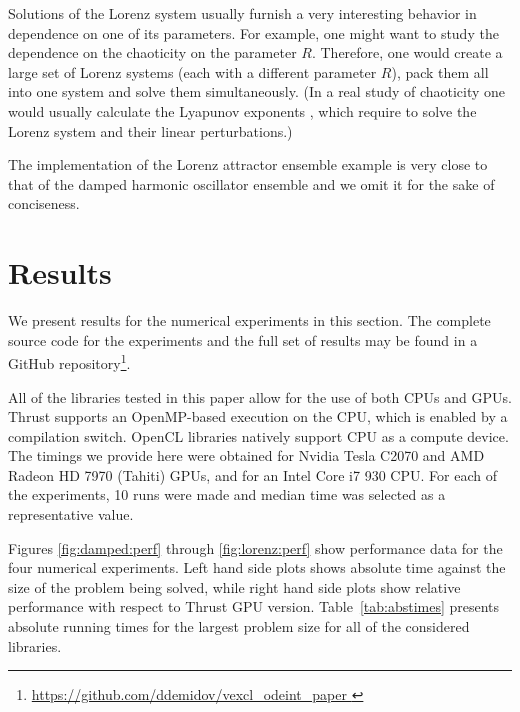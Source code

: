 \documentclass[1p]{elsarticle}
\begin{document}
Solutions of the Lorenz system usually furnish a very interesting
behavior in dependence on one of its parameters.  For example, one
might want to study the dependence on the chaoticity on the parameter
$R$. Therefore, one would create a large set of Lorenz systems (each
with a different parameter $R$), pack them all into one system and
solve them simultaneously. (In a real study of chaoticity one would
usually calculate the Lyapunov exponents \cite{Ott-book-02}, which
require to solve the Lorenz system and their linear perturbations.)


The implementation of the Lorenz attractor ensemble example is very close to
that of the damped harmonic oscillator ensemble and we omit it for the sake of
conciseness.



\section{Results}

We present results for the numerical experiments in this section. The complete
source code for the experiments and the full set of results may be found in a
GitHub repository\footnote{ \href{
https://github.com/ddemidov/vexcl_odeint_paper } {
https://github.com/ddemidov/vexcl\_odeint\_paper } }.


All of the libraries tested in this paper allow for the use of both CPUs and
GPUs.  Thrust supports an OpenMP-based execution on the CPU, which is enabled
by a compilation switch. OpenCL libraries natively support CPU as a compute
device.  The timings we provide here were obtained for Nvidia Tesla C2070 and
AMD Radeon HD 7970 (Tahiti) GPUs, and for an Intel Core i7 930 CPU. For each of
the experiments, 10 runs were made and median time was selected as a
representative value.

Figures \ref{fig:damped:perf} through \ref{fig:lorenz:perf} show performance
data for the four numerical experiments. Left hand side plots shows absolute
time against the size of the problem being solved, while right hand side plots
show relative performance with respect to Thrust GPU version.
Table~\ref{tab:abstimes} presents absolute running times for the largest
problem size for all of the considered libraries.
\end{document}
